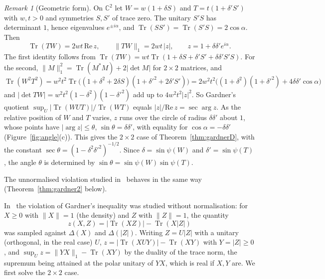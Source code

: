 \documentclass[11pt]{article}
\DeclareMathOperator{\Tr}{Tr}
\newcommand{\C}{\mathbb{C}}
\renewcommand{\Re}{\mathrm{Re}\,}
\theoremstyle{plain}
\theoremstyle{definition}
\theoremstyle{remark}
\newtheorem{remark}[theorem]{Remark}
\begin{document}
\begin{remark}[Geometric form]\label{rem:geom}
On $\C^2$ let $W=w(1+\delta S)$ and $T=t(1+\delta'S')$ with $w,t>0$ and symmetries $S,S'$ of trace zero. The unitary $S'S$ has
determinant $1$, hence eigenvalues $e^{\pm i\alpha}$, and $\Tr(SS')=\Tr(S'S)=2\cos\alpha$. Then
\[
  \Tr(TW)=2wt\,\Re z,\qquad \|TW\|_1=2wt\,|z|,\qquad z=1+\delta\delta'e^{i\alpha}.
\]
The first identity follows from $\Tr(TW)=wt\Tr(1+\delta S+\delta'S'+\delta\delta'S'S)$. For the second, $\|M\|_1^2=\Tr(M^*M)+
2|\det M|$ for $2\times2$ matrices, and $\Tr(W^2T^2)=w^2t^2\Tr\bigl((1+\delta^2+2\delta S)(1+\delta'^2+2\delta'S')\bigr)=
2w^2t^2\bigl((1+\delta^2)(1+\delta'^2)+4\delta\delta'\cos\alpha\bigr)$ and $|\det TW|=w^2t^2(1-\delta^2)(1-\delta'^2)$ add up to
$4w^2t^2|z|^2$. So Gardner's quotient $\sup_U|\Tr(WUT)|/\Tr(WT)$ equals $|z|/\Re z=\sec\arg z$. As the relative position of
$W$ and $T$ varies, $z$ runs over the circle of radius $\delta\delta'$ about $1$, whose points have $|\arg z|\le\theta$,
$\sin\theta=\delta\delta'$, with equality for $\cos\alpha=-\delta\delta'$ (Figure~\ref{fig:angle}(c)). This gives the
$2\times2$ case of Theorem~\ref{thm:gardnerD}, with the constant $\sec\theta=(1-\delta^2\delta'^2)^{-1/2}$. Since
$\delta=\sin\psi(W)$ and $\delta'=\sin\psi(T)$, the angle $\theta$ is determined by $\sin\theta=\sin\psi(W)\sin\psi(T)$.
\end{remark}

The unnormalised violation studied in~\cite{abed2024} behaves in the same way (Theorem~\ref{thm:gardner2} below).

In~\cite[Sect.~5]{abed2024} the violation of Gardner's inequality was studied without normalisation: for $X\ge0$ with
$\|X\|=1$ (the density) and $Z$ with $\|Z\|=1$, the quantity
\[
  z(X,Z)=|\Tr(XZ)|-\Tr(X|Z|)
\]
was sampled against $\Delta(X)$ and $\Delta(|Z|)$. Writing $Z=U|Z|$ with a unitary (orthogonal, in the real case) $U$,
$z=|\Tr(XUY)|-\Tr(XY)$ with $Y=|Z|\ge0$, and $\sup_Uz=\|YX\|_1-\Tr(XY)$ by the duality of the trace norm, the supremum being
attained at the polar unitary of $YX$, which is real if $X,Y$ are. We first solve the $2\times2$ case.
\end{document}
